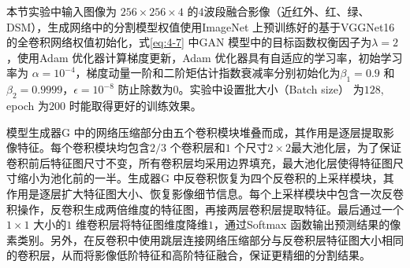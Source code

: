 本节实验中输入图像为 $256\times 256\times 4$ 的4波段融合影像（近红外、红、绿、DSM），生成网络中的分割模型权值使用ImageNet 上预训练好的基于VGGNet16\cite{simonyan2014very} 的全卷积网络权值初始化，式\ref{eq:4-7} 中GAN 模型中的目标函数权衡因子为$\lambda = 2$ ，使用Adam \cite{kingma2014adam} 优化器计算梯度更新，Adam 优化器具有自适应的学习率，初始学习率为 $\alpha = 10^{-4}$，梯度动量一阶和二阶矩估计指数衰减率分别初始化为$\beta_1 = 0.9$ 和$\beta_2 = 0.9999$，$\epsilon = 10^{-8}$ 防止除数为$0$。实验中设置批大小（Batch size） 为$128$, epoch 为$200$ 时能取得更好的训练效果。

模型生成器G 中的网络压缩部分由五个卷积模块堆叠而成，其作用是逐层提取影像特征。每个卷积模块均包含$2/3$ 个卷积层和$1$ 个尺寸$2\times 2$最大池化层，为了保证卷积前后特征图尺寸不变，所有卷积层均采用边界填充，最大池化层使得特征图尺寸缩小为池化前的一半。生成器G 中反卷积恢复为四个反卷积的上采样模块，其作用是逐层扩大特征图大小、恢复影像细节信息。每个上采样模块中包含一次反卷积操作，反卷积生成两倍维度的特征图，再接两层卷积层提取特征。最后通过一个$1\times 1$ 大小的$1$ 维卷积层将特征图维度降维$1$，通过Softmax 函数输出预测结果的像素类别。另外，在反卷积中使用跳层连接网络压缩部分与反卷积层特征图大小相同的卷积层，从而将影像低阶特征和高阶特征融合，保证更精细的分割结果。

